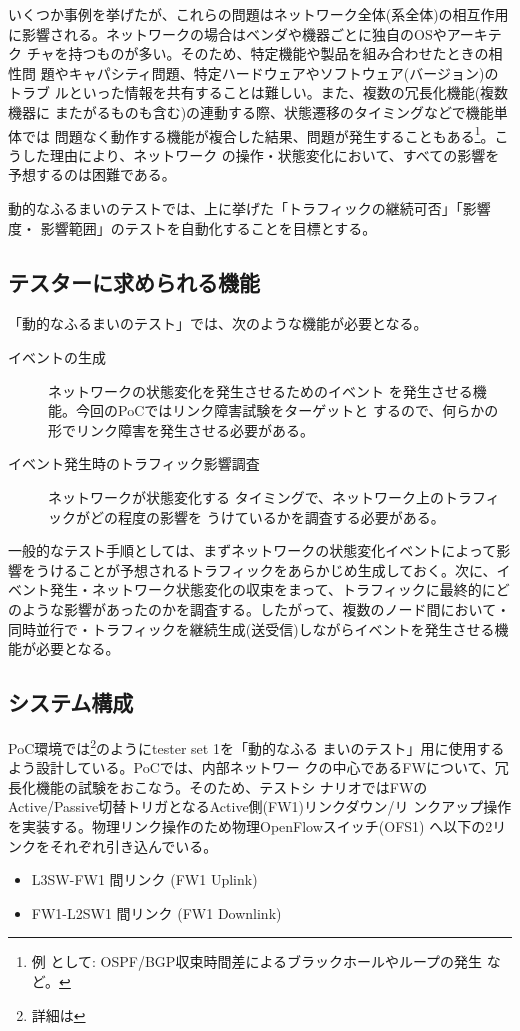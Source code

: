 いくつか事例を挙げたが、これらの問題はネットワーク全体(系全体)の相互作用
に影響される。ネットワークの場合はベンダや機器ごとに独自のOSやアーキテク
チャを持つものが多い。そのため、特定機能や製品を組み合わせたときの相性問
題やキャパシティ問題、特定ハードウェアやソフトウェア(バージョン)のトラブ
ルといった情報を共有することは難しい。また、複数の冗長化機能(複数機器に
またがるものも含む)の連動する際、状態遷移のタイミングなどで機能単体では
問題なく動作する機能が複合した結果、問題が発生することもある\footnote{例
として: OSPF/BGP収束時間差によるブラックホールやループの発生
\cite{j3g14-packet-forwarding}など。}。こうした理由により、ネットワーク
の操作・状態変化において、すべての影響を予想するのは困難である。

動的なふるまいのテストでは、上に挙げた「トラフィックの継続可否」「影響度・
影響範囲」のテストを自動化することを目標とする。

  \subsection{テスターに求められる機能}

「動的なふるまいのテスト」では、次のような機能が必要となる。
\begin{description}
 \item[イベントの生成] ネットワークの状態変化を発生させるためのイベント
            を発生させる機能。今回のPoCではリンク障害試験をターゲットと
            するので、何らかの形でリンク障害を発生させる必要がある。
 \item[イベント発生時のトラフィック影響調査] ネットワークが状態変化する
            タイミングで、ネットワーク上のトラフィックがどの程度の影響を
            うけているかを調査する必要がある。
\end{description}
一般的なテスト手順としては、まずネットワークの状態変化イベントによって影
響をうけることが予想されるトラフィックをあらかじめ生成しておく。次に、イ
ベント発生・ネットワーク状態変化の収束をまって、トラフィックに最終的にど
のような影響があったのかを調査する。したがって、複数のノード間において・
同時並行で・トラフィックを継続生成(送受信)しながらイベントを発生させる機
能が必要となる。

  \subsection{システム構成}
PoC環境では\footnote{詳細は
}のようにtester set 1を「動的なふる
まいのテスト」用に使用するよう設計している。PoCでは、\yo 内部ネットワー
クの中心であるFWについて、冗長化機能の試験をおこなう。そのため、テストシ
ナリオではFWのActive/Passive切替トリガとなるActive側(FW1)リンクダウン/リ
ンクアップ操作を実装する。物理リンク操作のため物理OpenFlowスイッチ(OFS1)
へ以下の2リンクをそれぞれ引き込んでいる。
\begin{itemize}
 \item L3SW-FW1 間リンク (FW1 Uplink)
 \item FW1-L2SW1 間リンク (FW1 Downlink)
\end{itemize}

